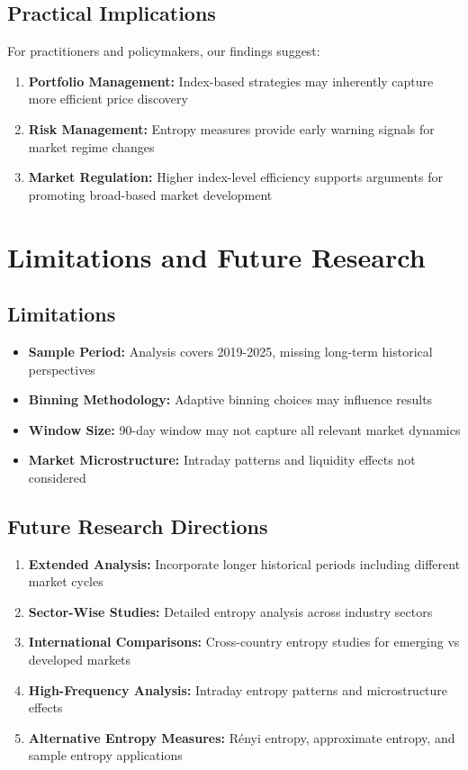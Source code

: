 \documentclass[12pt,a4paper]{article}
\begin{document}
\subsection{Practical Implications}

For practitioners and policymakers, our findings suggest:

\begin{enumerate}
    \item \textbf{Portfolio Management:} Index-based strategies may inherently capture more efficient price discovery
    \item \textbf{Risk Management:} Entropy measures provide early warning signals for market regime changes
    \item \textbf{Market Regulation:} Higher index-level efficiency supports arguments for promoting broad-based market development
\end{enumerate}

\section{Limitations and Future Research}

\subsection{Limitations}

\begin{itemize}
    \item \textbf{Sample Period:} Analysis covers 2019-2025, missing long-term historical perspectives
    \item \textbf{Binning Methodology:} Adaptive binning choices may influence results
    \item \textbf{Window Size:} 90-day window may not capture all relevant market dynamics
    \item \textbf{Market Microstructure:} Intraday patterns and liquidity effects not considered
\end{itemize}

\subsection{Future Research Directions}

\begin{enumerate}
    \item \textbf{Extended Analysis:} Incorporate longer historical periods including different market cycles
    \item \textbf{Sector-Wise Studies:} Detailed entropy analysis across industry sectors
    \item \textbf{International Comparisons:} Cross-country entropy studies for emerging vs developed markets
    \item \textbf{High-Frequency Analysis:} Intraday entropy patterns and microstructure effects
    \item \textbf{Alternative Entropy Measures:} Rényi entropy, approximate entropy, and sample entropy applications
\end{enumerate}
\end{document}
